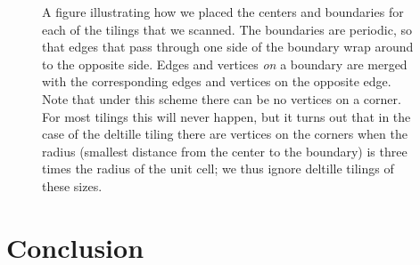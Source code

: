 \documentclass[twocolumn,showpacs,preprintnumbers,amsmath,amssymb,nofootinbib,pra,floatfix]{revtex4-1}
\begin{document}
\begin{figure}
\caption{
\label{figure:boundaries}
A figure illustrating how we placed the centers and boundaries for each of the tilings that we scanned.  The boundaries are periodic, so that edges that pass through one side of the boundary wrap around to the opposite side.  Edges and vertices \emph{on} a boundary are merged with the corresponding edges and vertices on the opposite edge.
Note that under this scheme there can be no vertices on a corner.  For most tilings this will never happen, but it turns out that in the case of the deltille tiling there are vertices on the corners when the radius (smallest distance from the center to the boundary) is three times the radius of the unit cell;  we thus ignore deltille tilings of these sizes.
}
\end{figure}
\section{Conclusion}


\end{document}
